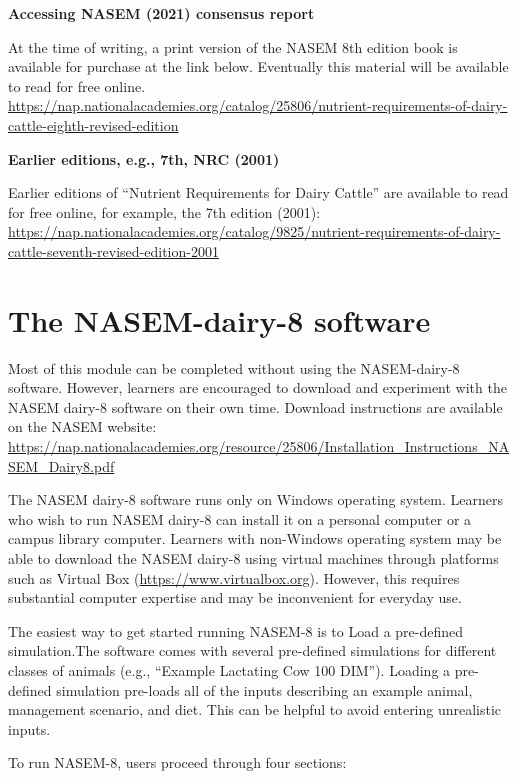 \documentclass[
]{book}
\begin{document}
\textbf{Accessing NASEM (2021) consensus report}

At the time of writing, a print version of the NASEM 8th edition book is available for purchase at the link below. Eventually this material will be available to read for free online.
\url{https://nap.nationalacademies.org/catalog/25806/nutrient-requirements-of-dairy-cattle-eighth-revised-edition}

\textbf{Earlier editions, e.g., 7th, NRC (2001)}

Earlier editions of ``Nutrient Requirements for Dairy Cattle'' are available to read for free online, for example, the 7th edition (2001):
\url{https://nap.nationalacademies.org/catalog/9825/nutrient-requirements-of-dairy-cattle-seventh-revised-edition-2001}

\hypertarget{the-nasem-dairy-8-software}{%
\section{The NASEM-dairy-8 software}\label{the-nasem-dairy-8-software}}

Most of this module can be completed without using the NASEM-dairy-8 software. However, learners are encouraged to download and experiment with the NASEM dairy-8 software on their own time. Download instructions are available on the NASEM website: \url{https://nap.nationalacademies.org/resource/25806/Installation_Instructions_NASEM_Dairy8.pdf}

The NASEM dairy-8 software runs only on Windows operating system. Learners who wish to run NASEM dairy-8 can install it on a personal computer or a campus library computer. Learners with non-Windows operating system may be able to download the NASEM dairy-8 using virtual machines through platforms such as Virtual Box (\url{https://www.virtualbox.org}). However, this requires substantial computer expertise and may be inconvenient for everyday use.

The easiest way to get started running NASEM-8 is to Load a pre-defined simulation.The software comes with several pre-defined simulations for different classes of animals (e.g., ``Example Lactating Cow 100 DIM''). Loading a pre-defined simulation pre-loads all of the inputs describing an example animal, management scenario, and diet. This can be helpful to avoid entering unrealistic inputs.

To run NASEM-8, users proceed through four sections:
\end{document}
